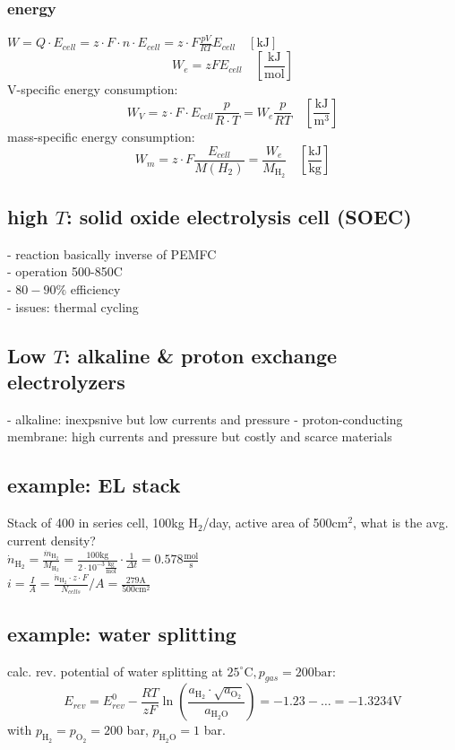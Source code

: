\documentclass[a4paper,10pt,landscape]{scrartcl}
\begin{document}
\begin{multicols*}{3}
\subsubsection{energy}
$W=Q\cdot E_{cell}=z\cdot F\cdot n\cdot E_{cell}=z\cdot F\frac{pV}{RT} E_{cell} \quad[\mathrm{kJ}]$
$$W_e = zFE_{cell} \quad \left[\mathrm{\frac{kJ}{mol}}\right]$$
V-specific energy consumption:
$$W_V=z\cdot F\cdot E_{cell}\frac{p}{R\cdot T}=W_e\frac{p}{RT} \quad\left[\mathrm{\frac{kJ}{m^3}}\right]$$
mass-specific energy consumption:
$$W_m=z\cdot F\frac{E_{cell}}{M(H_2)}=\frac{W_e}{M_\mathrm{H_2}} \quad\left[\mathrm{\frac{kJ}{kg}}\right]$$

\subsection{high $T$: solid oxide electrolysis cell (SOEC)}
- reaction basically inverse of PEMFC \\
- operation 500-850C \\
- $80-90\%$ efficiency \\
- issues: thermal cycling
\subsection{Low $T$: alkaline \& proton exchange electrolyzers}
- alkaline: inexpsnive but low currents and pressure
- proton-conducting membrane: high currents and pressure but costly and scarce materials
\subsection{example: EL stack}
Stack of 400 in series cell, 100kg $\mathrm{H_2}$/day, active area of 500cm$^2$, what is the avg. current density? \\
$\Dot{n}_\mathrm{H_2} = \frac{\Dot{m}_\mathrm{H_2}}{M_\mathrm{H_2}}= \frac{100\mathrm{kg}}{2\cdot10^{-3}\mathrm{\frac{kg}{mol}}}\cdot\frac{1}{\Delta t}=0.578\mathrm{\frac{mol}{s}}$ \\
$i=\frac{I}{A}=\frac{\Dot{n}_\mathrm{H_2}\cdot z\cdot F}{N_{cells}}/A=\frac{279 \mathrm{A}}{500 \mathrm{cm}^2}$

\subsection{example: water splitting}
calc. rev. potential of water splitting at $25^\circ\mathrm{C}, p_{gas}=200\mathrm{bar}$: \\
$$E_{rev}=E^0_{rev}-\frac{RT}{zF}\ln{\left(\frac{a_\mathrm{H_2}\cdot \sqrt{a_\mathrm{O_2}}}{a_\mathrm{H_2O}}\right)}=-1.23-\dots=-1.3234\mathrm{V}$$
with $p_\mathrm{H_2}=p_\mathrm{O_2}=200$ bar, $p_\mathrm{H_2O}=1$ bar.


\end{multicols*}
\end{document}
